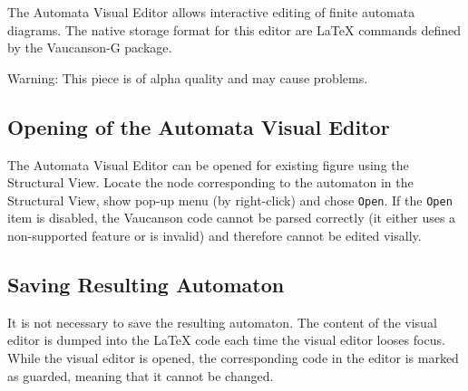 \documentclass{article}
\begin{document}
\label{sec:gui:ed}

The Automata Visual Editor allows interactive editing of finite automata diagrams.
The native storage format for this editor are \LaTeX{} commands defined by the Vaucanson-G
package.

Warning: This piece is of alpha quality and may cause problems.

\subsection{Opening of the Automata Visual Editor}

The Automata Visual Editor can be opened for existing figure using the Structural View.
Locate the node corresponding to the automaton in the Structural View, show pop-up
menu (by right-click) and chose \verb+Open+. If the \verb+Open+ item is disabled,
the Vaucanson code cannot be parsed correctly (it either uses a non-supported feature
or is invalid) and therefore cannot be edited visally.

\subsection{Saving Resulting Automaton}

It is not necessary to save the resulting automaton. The content of the visual editor
is dumped into the \LaTeX{} code each time the visual editor looses focus.
While the visual editor is opened, the corresponding code in the editor is marked as
guarded, meaning that it cannot be changed.

\end{document}
